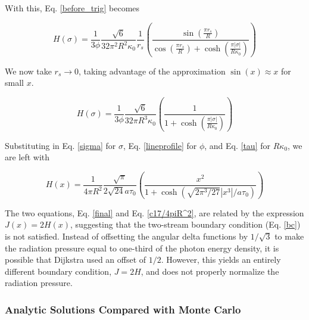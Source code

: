 \documentclass[onecolumn]{aastex63}
\begin{document}
With this, Eq. \ref{before_trig} becomes

\begin{equation} \label{after_trig}
    H(\sigma) = \frac{1}{3 \phi} \frac{\sqrt{6}}{32 \pi^2 R^2 \kappa_0} \frac{1}{r_s} \left(\frac{\sin{\left(\frac{\pi r_s}{R}\right)}}{\cos{\left(\frac{\pi r_s}{R}\right)} + \cosh{\left(\frac{\pi |\sigma|}{R\kappa_0}\right)}}\right)
\end{equation}

We now take $r_s \rightarrow 0$, taking advantage of the approximation $\sin(x) \approx x$ for small $x$.

\begin{equation}
    H(\sigma) = \frac{1}{3 \phi} \frac{\sqrt{6}}{32 \pi R^3 \kappa_0} \left(\frac{1}{1 + \cosh{\left(\frac{\pi |\sigma|}{R\kappa_0}\right)}}\right)
\end{equation}

Substituting in Eq. \ref{sigma} for $\sigma$, Eq. \ref{lineprofile} for $\phi$, and Eq. \ref{tau} for $R \kappa_0$, we are left with

\begin{equation} \label{final}
    H(x) = \frac{1}{4\pi R^2}\frac{\sqrt{\pi}}{2\sqrt{24}a\tau_0} \left(\frac{x^2}{1 + \cosh{\left(\sqrt{2\pi^3/27}|x^3|/a\tau_0\right)}}\right)
\end{equation}

The two equations, Eq. \ref{final} and Eq. \ref{c17/4piR^2}, are related by the expression $J(x) = 2 H(x)$, suggesting that the two-stream boundary condition (Eq. \ref{bc}) is not satisfied. Instead of offsetting the angular delta functions by $1/\sqrt{3}$ to make the radiation pressure equal to one-third of the photon energy density, it is possible that Dijkstra used an offset of $1/2$. However, this yields an entirely different boundary condition, $J = 2H$, and does not properly normalize the radiation pressure.

\subsubsection{Analytic Solutions Compared with Monte Carlo}
\end{document}
